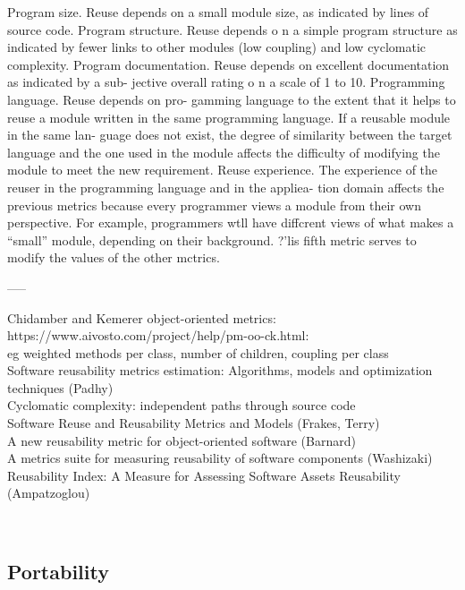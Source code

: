 \documentclass{article}
\begin{document}
Program size. Reuse depends on a small module
size, as indicated by lines of source code.
Program structure. Reuse depends o n a simple
program structure as indicated by fewer links to
other modules (low coupling) and low
cyclomatic complexity.
Program documentation.
Reuse depends on
excellent documentation as indicated by a sub-
jective overall rating o n a scale of 1 to 10.
Programming language. Reuse depends on pro-
gamming language to the extent that it helps to
reuse a module written in the same programming
language. If a reusable module in the same lan-
guage does not exist, the degree of similarity
between the target language and the one used in
the module affects the difficulty of modifying the
module to meet the new requirement.
Reuse experience. The experience of the reuser
in the programming language and in the appliea-
tion domain affects the previous metrics because
every programmer views a module from their
own perspective. For example, programmers
wtll have diffcrent views of what makes a
“small” module, depending on their background.
?’lis fifth metric serves to modify the values of
the other mctrics.


-----

Chidamber and Kemerer object-oriented metrics:\\ 

https://www.aivosto.com/project/help/pm-oo-ck.html:\\ 

eg weighted methods per class, number of children, coupling per class\\ 

Software reusability metrics estimation: Algorithms, models and optimization techniques (Padhy)\\ 

Cyclomatic complexity: independent paths through source code\\ 

Software Reuse and Reusability Metrics and Models (Frakes, Terry)\\ 

A new reusability metric for object-oriented software (Barnard)\\ 

A metrics suite for measuring reusability of software components (Washizaki)\\ 

Reusability Index: A Measure for Assessing Software Assets Reusability (Ampatzoglou) 

~\newpage
\subsection{Portability}
\end{document}
